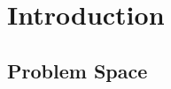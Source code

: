 \documentclass[journal]{IEEEtran}
\begin{document}
%
\IEEEpeerreviewmaketitle



\section{Introduction}\label{intro}
% 
% 
% 
% 

\subsection{Problem Space}
\end{document}
